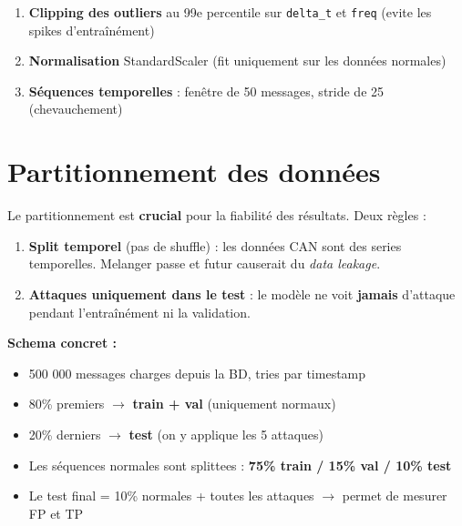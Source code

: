 \documentclass[12pt,a4paper]{article}
\begin{document}
\begin{enumerate}[noitemsep]
    \item \textbf{Clipping des outliers} au 99e percentile sur \texttt{delta\_t} et \texttt{freq} (evite les spikes d'entraînément)
    \item \textbf{Normalisation} StandardScaler (fit uniquement sur les données normales)
    \item \textbf{Séquences temporelles} : fenêtre de 50 messages, stride de 25 (chevauchement)
\end{enumerate}

\section{Partitionnement des données}

Le partitionnement est \textbf{crucial} pour la fiabilité des résultats. Deux règles :

\begin{tcolorbox}[colback=navy!5, colframe=navy, title=\textbf{Règles de partitionnement}]
\begin{enumerate}
    \item \textbf{Split temporel} (pas de shuffle) : les données CAN sont des series temporelles. Melanger passe et futur causerait du \textit{data leakage}.
    \item \textbf{Attaques uniquement dans le test} : le modèle ne voit \textbf{jamais} d'attaque pendant l'entraînément ni la validation.
\end{enumerate}
\end{tcolorbox}

\textbf{Schema concret :}
\begin{itemize}[noitemsep]
    \item 500 000 messages charges depuis la BD, tries par timestamp
    \item 80\% premiers $\to$ \textbf{train + val} (uniquement normaux)
    \item 20\% derniers $\to$ \textbf{test} (on y applique les 5 attaques)
    \item Les séquences normales sont splittees : \textbf{75\% train / 15\% val / 10\% test}
    \item Le test final = 10\% normales + toutes les attaques $\to$ permet de mesurer FP et TP
\end{itemize}
\end{document}
